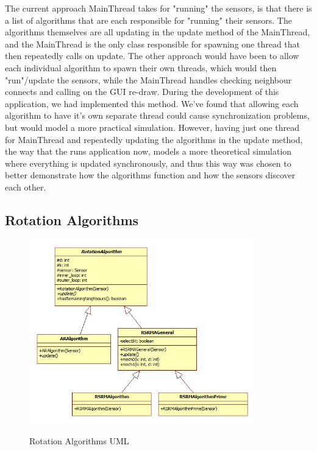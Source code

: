 The current approach MainThread takes for "running" the sensors, is that there is a list of 
algorithms that are each responsible for "running" their sensors. The algorithms themselves 
are all updating in the update method of the MainThread, and the MainThread is the only class 
responsible for spawning one thread that then repeatedly calls on update. The other approach 
would have been to allow each individual algorithm to spawn their own threads, which would 
then "run"/update the sensors, while the MainThread handles checking neighbour connects and 
calling on the GUI re-draw. During the development of this application, we had implemented 
this method. We've found that allowing each algorithm to have it's own separate thread could 
cause synchronization problems, but would model a more practical simulation. However, having 
just one thread for MainThread and repeatedly updating the algorithms in the update method, 
the way that the runs application now, models a more theoretical simulation where everything 
is updated synchronously, and thus this way was chosen to better demonstrate how the 
algorithms function and how the sensors discover each other.


\subsection{Rotation Algorithms}

\begin{figure}[ht]
\centering
\caption{Rotation Algorithms UML}
\includegraphics[height = 8cm]{pics/algo.jpg}\\[0.5cm]    
\label{fig:rotalgo}
\end{figure}


